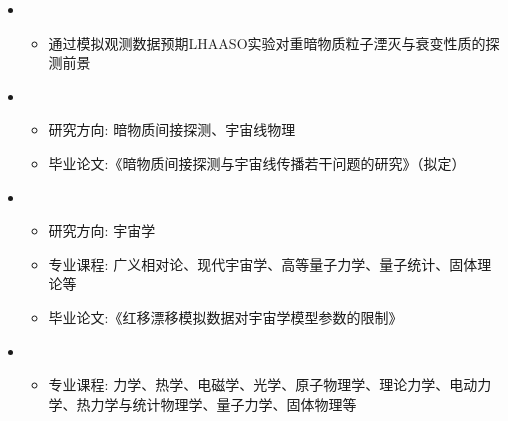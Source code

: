   \begin{itemize}[leftmargin=*]
     \item
      {\small
      \begin{itemize}
         \item 通过模拟观测数据预期LHAASO实验对重暗物质粒子湮灭与衰变性质的探测前景     
      \end{itemize}
      }
    \item
      {\small
      \begin{itemize}
         \item 研究方向:  暗物质间接探测、宇宙线物理
         \item 毕业论文:《暗物质间接探测与宇宙线传播若干问题的研究》（拟定）
      \end{itemize}
      }
      
     \item    
      {\small
      \begin{itemize}
         \item{研究方向:  宇宙学}
         \item 专业课程: 广义相对论、现代宇宙学、高等量子力学、量子统计、固体理论等       
         \item 毕业论文:《红移漂移模拟数据对宇宙学模型参数的限制》
      \end{itemize}
      }

    \item
      {\small
      \begin{itemize}
         \item 专业课程: 力学、热学、电磁学、光学、原子物理学、理论力学、电动力学、热力学与统计物理学、量子力学、固体物理等
      \end{itemize}
      }
  \end{itemize}